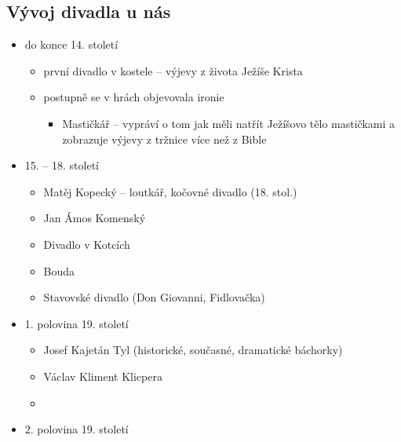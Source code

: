 \subsection{Vývoj divadla u nás}
\begin{itemize}
\item do konce 14. století
	\begin{itemize}
	\item první divadlo v kostele -- výjevy z života Ježíše Krista
	\item postupně se v hrách objevovala ironie 
		\begin{itemize}
		\item Mastičkář -- vypráví o tom jak měli natřít Ježíšovo tělo mastičkami a zobrazuje výjevy z tržnice více než z Bible
		\end{itemize}
	\end{itemize}
\item 15. -- 18. století
	\begin{itemize}
	\item Matěj Kopecký -- loutkář, kočovné divadlo (18. stol.)
	\item Jan Ámos Komenský
	\item Divadlo v Kotcích
	\item Bouda
	\item Stavovské divadlo (Don Giovanni, Fidlovačka)
	\end{itemize}
\item 1. polovina 19. století
	\begin{itemize}
	\item Josef Kajetán Tyl (historické, současné, dramatické báchorky)
	\item Václav Kliment Klicpera
	\item 
	\end{itemize}
\item 2. polovina 19. století
\end{itemize}

